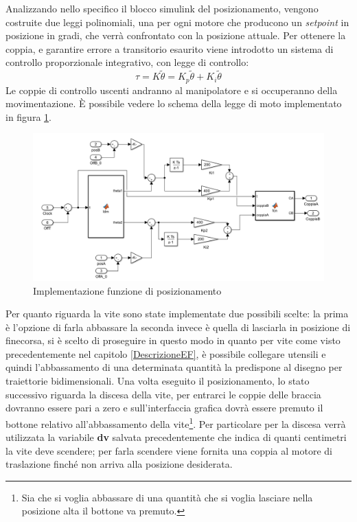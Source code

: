 Analizzando nello specifico il blocco simulink del posizionamento, vengono costruite due leggi polinomiali, una per ogni motore che producono un \textit{setpoint} in posizione in gradi, che verrà confrontato con la posizione attuale. Per ottenere la coppia, e garantire errore a transitorio esaurito viene introdotto un sistema di controllo proporzionale integrativo, con legge di controllo: 
\begin{equation*}
\tau = K \tilde{\theta} =  K_p\tilde{\theta} + K_i\tilde{\theta}
\end{equation*}
Le coppie di controllo uscenti andranno al manipolatore e si occuperanno della movimentazione. È possibile vedere lo schema della legge di moto implementato in figura \ref{fig:ImpPos}.
\begin{figure}[ht]
	\begin{center}
		\includegraphics[scale=0.6]{Immagini/Sperimentale/LdmPosizionamento}
		\caption{Implementazione funzione di posizionamento}
		\label{fig:ImpPos}
	\end{center}
\end{figure}
Per quanto riguarda la vite sono state implementate due possibili scelte: la prima è l'opzione di farla abbassare la seconda invece è quella di lasciarla in posizione di finecorsa, si è scelto di proseguire in questo modo in quanto per vite come visto precedentemente nel capitolo \ref{DescrizioneEF},  è possibile collegare utensili e quindi l'abbassamento di una determinata quantità la predispone al disegno per traiettorie bidimensionali. 
Una volta eseguito il posizionamento, lo stato successivo riguarda la discesa della vite, per entrarci le coppie delle braccia dovranno essere pari a zero e sull'interfaccia grafica dovrà essere premuto il bottone relativo all'abbassamento della vite\footnote{Sia che si voglia abbassare di una quantità che si voglia lasciare nella posizione alta il bottone va premuto.}. Per particolare per la discesa verrà utilizzata la variabile \textbf{dv} salvata precedentemente che indica di quanti centimetri la vite deve scendere; per farla scendere viene fornita una coppia al motore di traslazione finché non arriva alla posizione desiderata.
